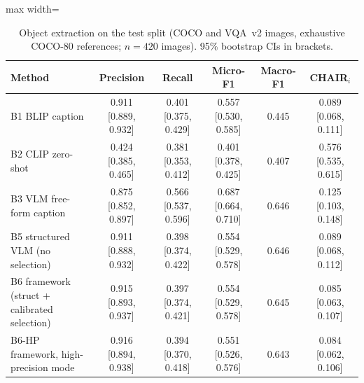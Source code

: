 \begin{table}[!t]
\centering
\scriptsize
\caption{Object extraction on the test split (COCO and VQA~v2 images, exhaustive COCO-80 references; $n=420$ images). 95\% bootstrap CIs in brackets.}
\label{tab:exp1_objects}
\begin{adjustbox}{max width=\textwidth}
\begin{tabular}{lccccc}
\toprule
Method & Precision & Recall & Micro-F1 & Macro-F1 & CHAIR$_i$ \\
\midrule
B1 BLIP caption & 0.911 [0.889, 0.932] & 0.401 [0.375, 0.429] & 0.557 [0.530, 0.585] & 0.445 & 0.089 [0.068, 0.111] \\
B2 CLIP zero-shot & 0.424 [0.385, 0.465] & 0.381 [0.353, 0.412] & 0.401 [0.378, 0.425] & 0.407 & 0.576 [0.535, 0.615] \\
B3 VLM free-form caption & 0.875 [0.852, 0.897] & 0.566 [0.537, 0.596] & 0.687 [0.664, 0.710] & 0.646 & 0.125 [0.103, 0.148] \\
B5 structured VLM (no selection) & 0.911 [0.888, 0.932] & 0.398 [0.374, 0.422] & 0.554 [0.529, 0.578] & 0.646 & 0.089 [0.068, 0.112] \\
B6 framework (struct + calibrated selection) & 0.915 [0.893, 0.937] & 0.397 [0.374, 0.421] & 0.554 [0.529, 0.578] & 0.645 & 0.085 [0.063, 0.107] \\
B6-HP framework, high-precision mode & 0.916 [0.894, 0.938] & 0.394 [0.370, 0.418] & 0.551 [0.526, 0.576] & 0.643 & 0.084 [0.062, 0.106] \\
\bottomrule
\end{tabular}
\end{adjustbox}
\end{table}
